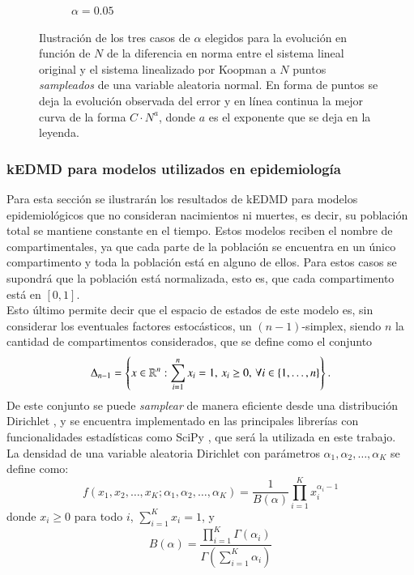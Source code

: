 \begin{figure}[h]
\begin{subfigure}[b]{0.32\textwidth}
        \caption{$\alpha=0.05$}
        \label{fig:image3}
    \end{subfigure}
    \caption{Ilustración de los tres casos de $\alpha$ elegidos para la evolución en función de $N$ de la diferencia en norma entre el sistema lineal original y el sistema linealizado por Koopman a $N$ puntos \textit{sampleados} de una variable aleatoria normal. En forma de puntos se deja la evolución observada del error y en línea continua la mejor curva de la forma $C \cdot N^{a}$, donde $a$ es el exponente que se deja en la leyenda.}
    \label{fig:ErrorLin}
\end{figure}
\subsubsection{kEDMD para modelos utilizados en epidemiología}
Para esta sección se ilustrarán los resultados de kEDMD para modelos epidemiológicos que no consideran nacimientos ni muertes, es decir, su población total se mantiene constante en el tiempo. Estos modelos reciben el nombre de compartimentales, ya que cada parte de la población se encuentra en un único compartimento y toda la población está en alguno de ellos. Para estos casos se supondrá que la población está normalizada, esto es, que cada compartimento está en $[0, 1]$.\\
Esto último permite decir que el espacio de estados de este modelo es, sin considerar los eventuales factores estocásticos, un $(n-1)$-simplex, siendo $n$ la cantidad de compartimentos considerados, que se define como el conjunto
\begin{equation*}
    \Delta_{n-1} = \left \{ x \in \mathbb{R}^n : \sum_{i=1}^n x_i = 1, \, x_i \geq 0, \, \forall i \in \{1, \dots, n\} \right \}.
\end{equation*}
De este conjunto se puede \textit{samplear} de manera eficiente desde una distribución Dirichlet \cite{Frigyik2010IntroductionProcesses}, y se encuentra implementado en las principales librerías con funcionalidades estadísticas como SciPy \cite{Virtanen2020SciPyPython}, que será la utilizada en este trabajo.\\
La densidad de una variable aleatoria Dirichlet con parámetros $\alpha_1, \alpha_2, \ldots, \alpha_K$ se define como:
\[
f(x_1, x_2, \ldots, x_K; \alpha_1, \alpha_2, \ldots, \alpha_K) = \frac{1}{B(\alpha)} \prod_{i=1}^{K} x_i^{\alpha_i - 1}
\]
donde $x_i \geq 0$ para todo $i$, $\sum_{i=1}^{K} x_i = 1$, y
\[
B(\alpha) = \frac{\prod_{i=1}^{K} \Gamma(\alpha_i)}{\Gamma\left(\sum_{i=1}^{K} \alpha_i\right)}
\]
